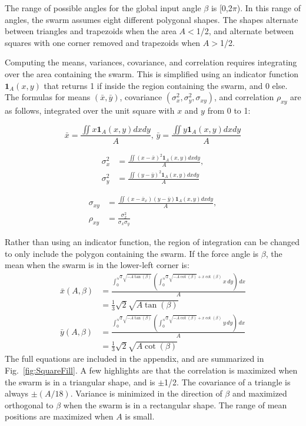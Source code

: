 The range of possible angles for the global input angle $\beta $ is [0,2$\pi $). In this range of angles, the swarm assumes eight different polygonal shapes. The shapes alternate between triangles and trapezoids when the area $A$$<$1/2, and alternate between squares with one corner removed and trapezoids when $A$$>$1/2.

Computing the means, variances, covariance, and correlation requires integrating over the area containing the swarm.  This is simplified using an indicator function $\bm{1}_A(x,y)$ that returns 1 if inside the region containing the swarm, and 0 else. The formulas for means $(\bar{x},\bar{y})$, covariance $(\sigma^2_x,\sigma^2_y,\sigma_{xy})$, and correlation $\rho_{xy}$ are as follows, integrated over the unit square with $x$ and $y$ from 0 to 1:

\begin{equation}\label{eq:meanInSquareWorkspace}
\bar{x} =\frac{\iint x \bm{1}_A(x,y)dxdy}{A}
\text{, }
\bar{y}=\frac{\iint y \bm{1}_A(x,y)dxdy}{A}
\end{equation}

\begin{align}\label{eq:varInSquareWorkspace}
\sigma^2_x &=\frac{\iint \left(x-\bar{x}\right)^2 \bm{1}_A(x,y) dx dy}{A}, \\
\sigma^2_y &=\frac{\iint  \left(y-\bar{y}\right)^2 \bm{1}_A(x,y) dx dy}{A}
\end{align}

\begin{align}\label{eq:covAndcorrInSquareWorkspace}
\sigma_{xy} &= \frac{\iint  \left(x-\bar{x}_x\right) \left(y-\bar{y}\right) \bm{1}_A(x,y) dx dy}{A},\\
\rho_{xy} &= \frac{\sigma^2_x}{\sigma_x\sigma_y}
\end{align}

Rather than using an indicator function, the region of integration can be changed to only include the polygon containing the swarm. If the force angle is $\beta$, the mean when the swarm is in the lower-left corner is:
\begin{align}\label{eq:meanInSquareWorkspaceLL}
\bar{x}(A,\beta) &= \frac{\int_0^{\sqrt{2} \sqrt{-A \tan (\beta )}} \left(\int_0^{\sqrt{2} \sqrt{-A \cot (\beta )}+x \cot (\beta )} x \, dy\right) \, dx}{A} \nonumber \\
	&=\frac{1}{3} \sqrt{2} \sqrt{A \tan (\beta )}\\
\bar{y}(A,\beta) &= \frac{\int_0^{\sqrt{2} \sqrt{-A \tan (\beta )}} \left(\int_0^{\sqrt{2} \sqrt{-A \cot (\beta )}+x \cot (\beta )} y \, dy\right) \, dx}{A} \nonumber\\
	&=\frac{1}{3} \sqrt{2} \sqrt{A \cot (\beta )}
\end{align}
The full equations are included in the appendix, and are summarized in Fig.~\ref{fig:SquareFill}. A few highlights are that the correlation is maximized when the swarm is in a triangular shape, and is $\pm$1/2. The covariance of a triangle is always $\pm(A/18)$. Variance is minimized in the direction of $\beta$ and maximized orthogonal to $\beta$ when the swarm is in a rectangular shape. The range of mean positions are maximized when $A$ is small.

